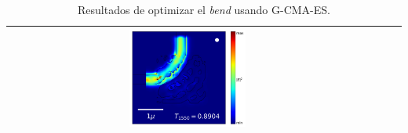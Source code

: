 \begin{table}[ht]
\begin{tabular}{|c|c|c|c|}
      \includegraphics[width=0.33\textwidth]{image/results/bend/CMA-ES/visualize_field_fab_512.png} \\
    \hline
    \end{tabular}
    \hspace*{-3cm}
    \caption{Resultados de optimizar el \emph{bend} usando G-CMA-ES.}
    \label{tab:opt-CMA-bend}
\end{table}


